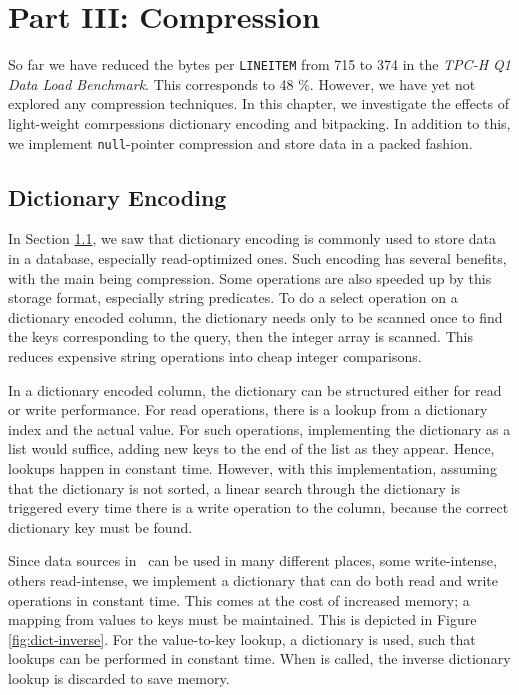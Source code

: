 \chapter{Part III: Compression}
\label{chap:Compression}
So far we have reduced the bytes per \texttt{LINEITEM} from 715 to 374 in the \textit{TPC-H Q1 Data Load Benchmark}. This corresponds to 48 \%. However, we have yet not explored any compression techniques. In this chapter, we investigate the effects of light-weight comrpessions dictionary encoding and bitpacking. In addition to this, we implement \texttt{null}-pointer compression and store data in a packed fashion.

\clearpage

\section{Dictionary Encoding}
\label{sec:Dictionary Encoding}
In Section \ref{sec:Dictionary Encoding}, we saw that dictionary encoding is commonly used to store data in a database, especially read-optimized ones. Such encoding has several benefits, with the main being compression. Some operations are also speeded up by this storage format, especially string predicates. To do a select operation on a dictionary encoded column, the dictionary needs only to be scanned once to find the keys corresponding to the query, then the integer array is scanned. This reduces expensive string operations into cheap integer comparisons.

In a dictionary encoded column, the dictionary can be structured either for read or write performance. For read operations, there is a lookup from a dictionary index and the actual value. For such operations, implementing the dictionary as a list would suffice, adding new keys to the end of the list as they appear. Hence, lookups happen in constant time. However, with this implementation, assuming that the dictionary is not sorted, a linear search through the dictionary is triggered every time there is a write operation to the column, because the correct dictionary key must be found. 

Since data sources in \gap~can be used in many different places, some write-intense, others read-intense, we implement a dictionary that can do both read and write operations in constant time. This comes at the cost of increased memory; a mapping from values to keys must be maintained. This is depicted in Figure \ref{fig:dict-inverse}. For the value-to-key lookup, a dictionary is used, such that lookups can be performed in constant time. When  is called, the inverse dictionary lookup is discarded to save memory. 

